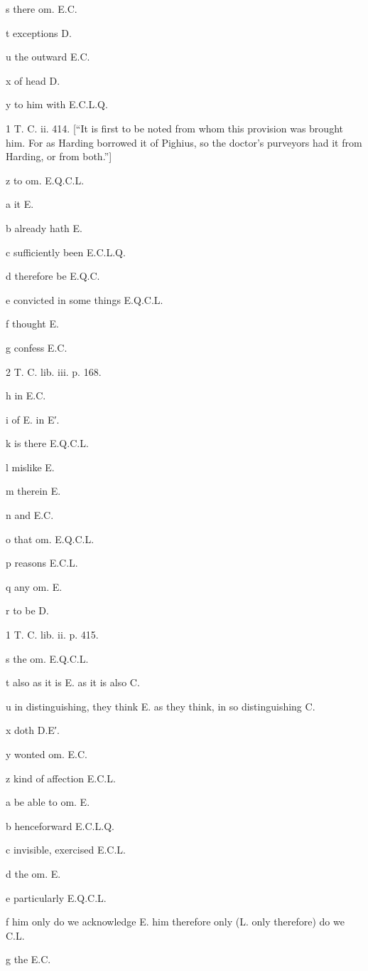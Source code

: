 s
there om. E.C.

t
exceptions D.

u
the outward E.C.

x
of head D.

y
to him with E.C.L.Q.

1
T. C. ii. 414. [“It is first to be noted from whom this provision was brought him. For as Harding borrowed it of Pighius, so the doctor’s purveyors had it from Harding, or from both.”]

z
to om. E.Q.C.L.

a
it E.

b
already hath E.

c
sufficiently been E.C.L.Q.

d
therefore be E.Q.C.

e
convicted in some things E.Q.C.L.

f
thought E.

g
confess E.C.

2
T. C. lib. iii. p. 168.

h
in E.C.

i
of E. in E′.

k
is there E.Q.C.L.

l
mislike E.

m
therein E.

n
and E.C.

o
that om. E.Q.C.L.

p
reasons E.C.L.

q
any om. E.

r
to be D.

1
T. C. lib. ii. p. 415.

s
the om. E.Q.C.L.

t
also as it is E. as it is also C.

u
in distinguishing, they think E. as they think, in so distinguishing C.

x
doth D.E′.

y
wonted om. E.C.

z
kind of affection E.C.L.

a
be able to om. E.

b
henceforward E.C.L.Q.

c
invisible, exercised E.C.L.

d
the om. E.

e
particularly E.Q.C.L.

f
him only do we acknowledge E. him therefore only (L. only therefore) do we C.L.

g
the E.C.

